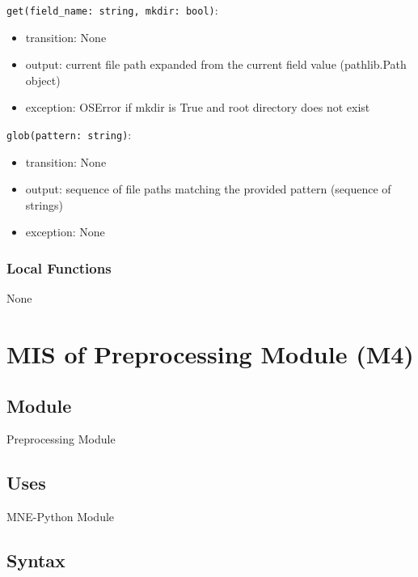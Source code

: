 \documentclass[12pt, titlepage]{article}
\begin{document}
\noindent \lstinline|get(field_name: string, mkdir: bool)|:
\begin{itemize}
    \item transition: None
    \item output: current file path expanded from the current field value (pathlib.Path object)
    \item exception: OSError if mkdir is True and root directory does not exist
\end{itemize}


\noindent \lstinline|glob(pattern: string)|:
\begin{itemize}
    \item transition: None
    \item output: sequence of file paths matching the provided pattern (sequence of strings)
    \item exception: None
\end{itemize}




\subsubsection{Local Functions}


None


\newpage








\section{MIS of Preprocessing Module (M4)}




\subsection{Module}


Preprocessing Module




\subsection{Uses}


MNE-Python Module




\subsection{Syntax}
\end{document}
